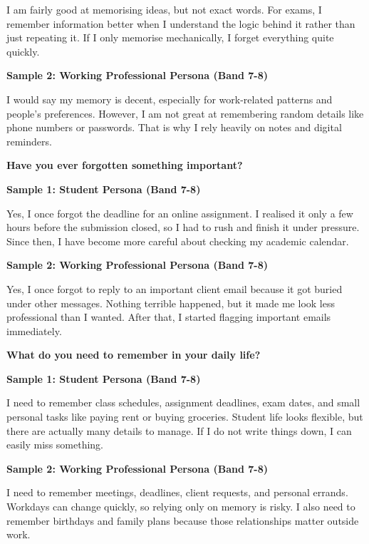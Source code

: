 I am fairly good at memorising ideas, but not exact words. For exams, I remember information better when I understand the logic behind it rather than just repeating it. If I only memorise mechanically, I forget everything quite quickly.

\textbf{Sample 2: Working Professional Persona (Band 7-8)}

I would say my memory is decent, especially for work-related patterns and people's preferences. However, I am not great at remembering random details like phone numbers or passwords. That is why I rely heavily on notes and digital reminders.

\separator

\begin{ieltsquestion}
\textbf{Have you ever forgotten something important?}
\end{ieltsquestion}
\textbf{Sample 1: Student Persona (Band 7-8)}

Yes, I once forgot the deadline for an online assignment. I realised it only a few hours before the submission closed, so I had to rush and finish it under pressure. Since then, I have become more careful about checking my academic calendar.

\textbf{Sample 2: Working Professional Persona (Band 7-8)}

Yes, I once forgot to reply to an important client email because it got buried under other messages. Nothing terrible happened, but it made me look less professional than I wanted. After that, I started flagging important emails immediately.

\separator

\begin{ieltsquestion}
\textbf{What do you need to remember in your daily life?}
\end{ieltsquestion}
\textbf{Sample 1: Student Persona (Band 7-8)}

I need to remember class schedules, assignment deadlines, exam dates, and small personal tasks like paying rent or buying groceries. Student life looks flexible, but there are actually many details to manage. If I do not write things down, I can easily miss something.

\textbf{Sample 2: Working Professional Persona (Band 7-8)}

I need to remember meetings, deadlines, client requests, and personal errands. Workdays can change quickly, so relying only on memory is risky. I also need to remember birthdays and family plans because those relationships matter outside work.

